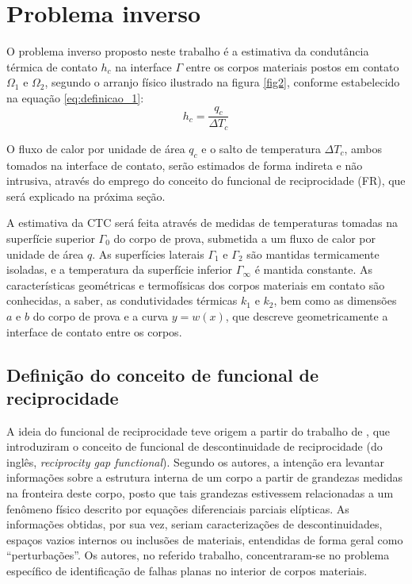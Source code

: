 \section{Problema inverso}\label{sec_prob_inv}

O problema inverso proposto neste trabalho é a estimativa da condutância térmica de contato $h_c$ na interface $\Gamma$ entre os corpos materiais
postos em contato $\Omega_1$ e $\Omega_2$, segundo o arranjo físico ilustrado na figura \ref{fig2}, conforme estabelecido na equação \eqref{eq:definicao_1}:
\begin{equation}
	h_c = \frac{q_c}{\Delta T_c}
\end{equation}

O fluxo de calor por unidade de área $q_c$ e o salto de temperatura $\Delta T_c$, ambos tomados na interface de contato, serão estimados de forma
indireta e não intrusiva, através do emprego do conceito do funcional de reciprocidade (FR), que será explicado na próxima seção.

A estimativa da CTC será feita através de medidas de temperaturas tomadas na superfície superior $\Gamma_0$ do corpo de prova, submetida a um fluxo
de calor por unidade de área $q$. As superfícies laterais $\Gamma_1$ e $\Gamma_2$ são mantidas termicamente isoladas, e a temperatura da superfície
inferior $\Gamma_\infty$ é mantida constante. As características geométricas e termofísicas dos corpos materiais em contato são conhecidas, a saber, as 
condutividades térmicas $k_1$ e $k_2$, bem como as dimensões $a$ e $b$ do corpo de prova e a curva $y = w(x)$, que descreve geometricamente a interface
de contato entre os corpos. 

\subsection{Definição do conceito de funcional de reciprocidade}

A ideia do funcional de reciprocidade teve origem a partir do trabalho de \cite{artigo_andrieux}, que introduziram o conceito de funcional de descontinuidade
de reciprocidade (do inglês, \textit{reciprocity gap functional}). Segundo os autores, a intenção era levantar informações sobre a estrutura interna de
um corpo a partir de grandezas medidas na fronteira deste corpo, posto que tais grandezas estivessem relacionadas a um fenômeno físico descrito por
equações diferenciais parciais elípticas. As informações obtidas, por sua vez, seriam caracterizações de descontinuidades, espaços vazios internos ou inclusões
de materiais, entendidas de forma geral como ``perturbações''. Os autores, no referido trabalho, concentraram-se no problema específico de identificação
de falhas planas no interior de corpos materiais.

